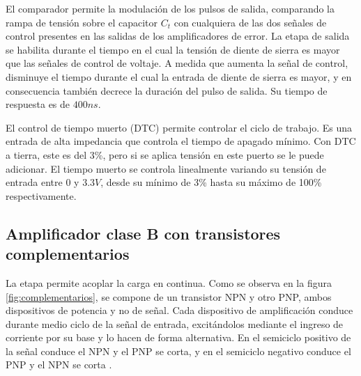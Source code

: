 El comparador permite la modulación de los pulsos de salida, comparando la rampa de tensión sobre el capacitor $C_t$ con cualquiera de las dos señales de control presentes en las salidas de los amplificadores de error.
La etapa de salida se habilita durante el tiempo en el cual la tensión de diente de sierra es mayor que las señales de control de voltaje. 
A medida que aumenta la señal de control, disminuye el tiempo durante el cual la entrada de diente de sierra es mayor, y en consecuencia también decrece la duración del pulso de salida. 
Su tiempo de respuesta es de $400ns$.

El control de tiempo muerto (DTC) permite controlar el ciclo de trabajo. 
Es una entrada de alta impedancia que controla el tiempo de apagado mínimo. Con DTC a tierra, este es del 3\%, pero si se aplica tensión en este puerto se le puede adicionar.
El tiempo muerto se controla linealmente variando su tensión de entrada entre $0$ y $3.3V$, desde su mínimo de 3\% hasta su máximo de 100\% respectivamente. 




\subsection{Amplificador clase B con transistores complementarios}

La etapa permite acoplar la carga en continua. 
Como se observa en la figura \ref{fig:complementarios}, se compone de un transistor NPN y otro PNP, ambos dispositivos de potencia y no de señal. 
Cada dispositivo de amplificación conduce durante medio ciclo de la señal de entrada, 
excitándolos mediante el ingreso de corriente por su base y lo hacen de forma alternativa. 
En el semiciclo positivo de la señal conduce el NPN y el PNP se corta, y en el semiciclo negativo conduce el PNP y el NPN se corta \cite{Gi}.

